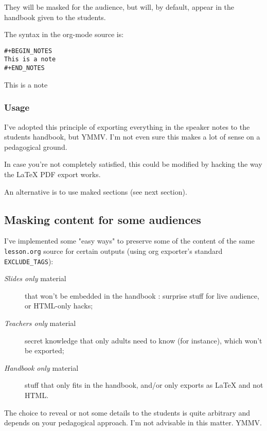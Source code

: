 \documentclass[a4paper]{article}
\begin{document}
They will be masked for the audience, but will, by default, appear in the handbook given to the students.

The syntax in the org-mode source is:
\begin{verbatim}
#+BEGIN_NOTES
This is a note
#+END_NOTES
\end{verbatim}

\begin{NOTES}
This is a note
\end{NOTES}

\subsubsection{Usage}
\label{sec:org5a24e57}

I've adopted this principle of exporting everything in the speaker
notes to the students handbook, but YMMV. I'm not even sure this makes
a lot of sense on a pedagogical ground.

In case you're not completely satisfied, this could be modified by
hacking the way the \LaTeX{} PDF export works.

An alternative is to use maked sections (see next section).

\subsection{Masking content for some audiences}
\label{sec:orgdf35cda}

I've implemented some "easy ways" to preserve some of the content of the same \texttt{lesson.org} source for certain outputs (using org exporter's standard \texttt{EXCLUDE\_TAGS}):

\begin{description}
\item[{\emph{Slides only} material}] that won't be embedded in the handbook : surprise stuff for live audience, or HTML-only hacks;
\item[{\emph{Teachers only} material}] secret knowledge that only adults need
to know (for instance), which won't be exported;
\end{description}
\begin{description}
\item[{\emph{Handbook only} material}] stuff that only fits in the handbook, and/or only exports as \LaTeX{} and not HTML.
\end{description}

\begin{NOTES}
The choice to reveal or not some details to the students is quite arbitrary and depends on your pedagogical approach. I'm not advisable in this matter. YMMV.
\end{NOTES}
\end{document}
